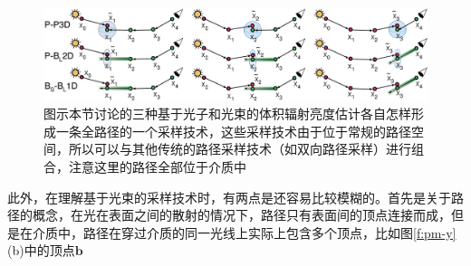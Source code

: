 \begin{figure}
\begin{fullwidth}
	\includegraphics[width=1.0\thewidth]{figures/pm/beam-sampling}
	\caption{图示本节讨论的三种基于光子和光束的体积辐射亮度估计各自怎样形成一条全路径的一个采样技术，这些采样技术由于位于常规的路径空间，所以可以与其他传统的路径采样技术（如双向路径采样）进行组合，注意这里的路径全部位于介质中}
	\label{f:pm-beam-sampling}
\end{fullwidth}
\end{figure}

此外，在理解基于光束的采样技术时，有两点是还容易比较模糊的。首先是关于路径的概念，在光在表面之间的散射的情况下，路径只有表面间的顶点连接而成，但是在介质中，路径在穿过介质的同一光线上实际上包含多个顶点，比如图\ref{f:pm-y}(b)中的顶点$\mathbf{b}$



